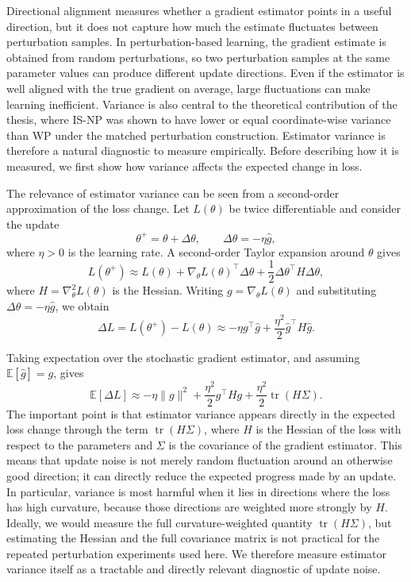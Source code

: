 Directional alignment measures whether a gradient estimator points in a useful direction, but it does not capture how much the estimate fluctuates between perturbation samples. In perturbation-based learning, the gradient estimate is obtained from random perturbations, so two perturbation samples at the same parameter values can produce different update directions. Even if the estimator is well aligned with the true gradient on average, large fluctuations can make learning inefficient. Variance is also central to the theoretical contribution of the thesis, where IS-NP was shown to have lower or equal coordinate-wise variance than WP under the matched perturbation construction. Estimator variance is therefore a natural diagnostic to measure empirically. Before describing how it is measured, we first show how variance affects the expected change in loss.

The relevance of estimator variance can be seen from a second-order approximation of the loss change. Let \(L(\theta)\) be twice differentiable and consider the update
\[
\theta^+ = \theta + \Delta\theta,
\qquad
\Delta\theta = -\eta \widehat{g},
\]
where \(\eta>0\) is the learning rate. A second-order Taylor expansion around \(\theta\) gives
\[
L(\theta^+)
\approx
L(\theta)
+
\nabla_\theta L(\theta)^\top \Delta\theta
+
\frac{1}{2}\Delta\theta^\top H\Delta\theta,
\]
where \(H=\nabla_\theta^2 L(\theta)\) is the Hessian. Writing \(g=\nabla_\theta L(\theta)\) and substituting \(\Delta\theta=-\eta\widehat{g}\), we obtain
\[
\Delta L
=
L(\theta^+) - L(\theta)
\approx
-\eta g^\top \widehat{g}
+
\frac{\eta^2}{2}\widehat{g}^\top H\widehat{g}.
\]

Taking expectation over the stochastic gradient estimator, and assuming \(\mathbb{E}[\widehat{g}]=g\), gives
\[
\mathbb{E}[\Delta L]
\approx
-\eta \|g\|^2
+
\frac{\eta^2}{2}g^\top H g
+
\frac{\eta^2}{2}\operatorname{tr}(H\Sigma).
\]
The important point is that estimator variance appears directly in the expected loss change through the term \(\operatorname{tr}(H\Sigma)\), where \(H\) is the Hessian of the loss with respect to the parameters and \(\Sigma\) is the covariance of the gradient estimator. This means that update noise is not merely random fluctuation around an otherwise good direction; it can directly reduce the expected progress made by an update. In particular, variance is most harmful when it lies in directions where the loss has high curvature, because those directions are weighted more strongly by \(H\). Ideally, we would measure the full curvature-weighted quantity \(\operatorname{tr}(H\Sigma)\), but estimating the Hessian and the full covariance matrix is not practical for the repeated perturbation experiments used here. We therefore measure estimator variance itself as a tractable and directly relevant diagnostic of update noise.


